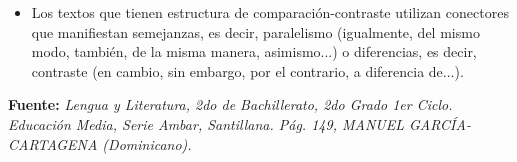 \documentclass[12pt]{article}
\begin{document}
\begin{enumerate}
\begin{itemize}
                \item Los textos que tienen estructura de
                    comparación-contraste utilizan conectores que manifiestan
                    semejanzas, es decir, paralelismo (igualmente, del mismo
                    modo, también, de la misma manera, asimismo...) o
                    diferencias, es decir, contraste (en cambio, sin embargo,
                    por el contrario, a diferencia de...).

            \end{itemize}

            \textbf{Fuente:} \emph{Lengua y Literatura, 2do de Bachillerato,
            2do Grado 1er Ciclo. Educación Media, Serie Ambar, Santillana.
            Pág. 149, MANUEL GARCÍA-CARTAGENA (Dominicano).}

\end{enumerate}
\end{document}
